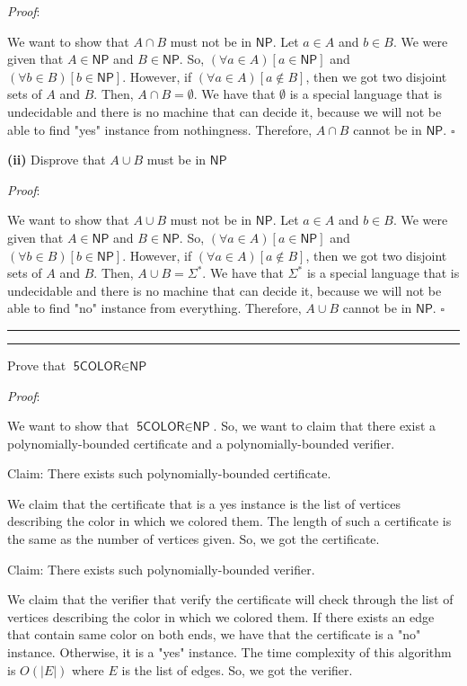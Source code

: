 \documentclass[a4paper, 11pt]{article}
\newcommand{\question}[2] {\vspace{.25in} \hrule\vspace{0.5em}
	\noindent{\bf #1: #2} \vspace{0.5em}
	\hrule \vspace{.10in}}
\renewcommand{\part}[1] {\vspace{.10in} {\bf (#1)}}
\begin{document}
	{\em Proof}: 
	
	We want to show that $A \cap B$ must not be in $\textsf{NP}$. Let $a \in A$ and $b \in B$. We were given that $A \in \textsf{NP}$ and $B \in \textsf{NP}$. So, $(\forall a \in A) [a \in \textsf{NP}]$ and $(\forall b \in B) [b \in \textsf{NP}]$. However, if $(\forall a \in A) [a \notin B]$, then we got two disjoint sets of $A$ and $B$. Then, $A \cap B = \emptyset$. We have that $\emptyset$ is a special language that is undecidable and there is no machine that can decide it, because we will not be able to find "yes" instance from nothingness. Therefore, $A \cap B$ cannot be in $\textsf{NP}$. $\square$
	
	\part{ii} Disprove that $A \cup B$ must be in $\textsf{NP}$
	
	{\em Proof}: 
	
	We want to show that $A \cup B$ must not be in $\textsf{NP}$. Let $a \in A$ and $b \in B$. We were given that $A \in \textsf{NP}$ and $B \in \textsf{NP}$. So, $(\forall a \in A) [a \in \textsf{NP}]$ and $(\forall b \in B) [b \in \textsf{NP}]$. However, if $(\forall a \in A) [a \notin B]$, then we got two disjoint sets of $A$ and $B$. Then, $A \cup B = \Sigma^*$. We have that $\Sigma^*$ is a special language that is undecidable and there is no machine that can decide it, because we will not be able to find "no" instance from everything. Therefore, $A \cup B$ cannot be in $\textsf{NP}$. $\square$
	
	\question{3}{This is NP}
	
	Prove that $\textsf{5COLOR} \in \textsf{NP}$
	
	{\em Proof}: 
	
	We want to show that $\textsf{5COLOR} \in \textsf{NP}$. So, we want to claim that there exist a polynomially-bounded certificate and a polynomially-bounded verifier.
	
	Claim: There exists such polynomially-bounded certificate.
	
	We claim that the certificate that is a yes instance is the list of vertices describing the color in which we colored them. The length of such a certificate is the same as the number of vertices given. So, we got the certificate.
	
	Claim: There exists such polynomially-bounded verifier.
	
	We claim that the verifier that verify the certificate will check through the list of vertices describing the color in which we colored them. If there exists an edge that contain same color on both ends, we have that the certificate is a "no" instance. Otherwise, it is a "yes" instance. The time complexity of this algorithm is $O(|E|)$ where $E$ is the list of edges. So, we got the verifier.
	
\end{document}
